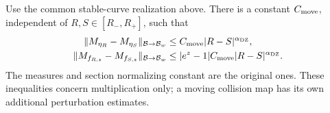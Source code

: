 \begin{theorem}
\label{thm:sm-moving}
Use the common stable-curve realization above. There is a constant
$C_{\rm move}$, independent of $R,S\in[R_-,R_+]$, such that
\begin{align}
 \|M_{\eta_R}-M_{\eta_S}\|_{\mathcal B\to\mathcal B_w}
       &\le C_{\rm move}|R-S|^{\alpha_{\rm DZ}},
                                                \label{eq:sm-weak-move}\\
 \|M_{f_{R,z}}-M_{f_{S,z}}\|_{\mathcal B\to\mathcal B_w}
       &\le |e^z-1|C_{\rm move}|R-S|^{\alpha_{\rm DZ}}.
                                                \label{eq:sm-phase-move}
\end{align}
The measures and section normalizing constant are the original
ones. These inequalities concern multiplication only; a moving
collision map has its own additional perturbation estimates.
\end{theorem}

